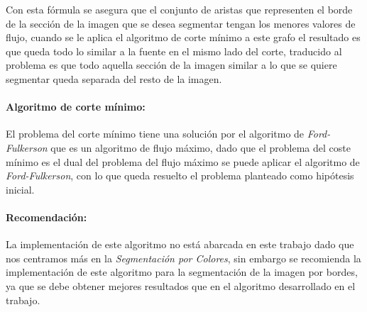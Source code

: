 \documentclass[a4paper,10pt,twocolumn]{article}
\begin{document}
Con esta f\'ormula se asegura que el conjunto de aristas que representen el borde de la secci\'on de la imagen que se desea segmentar 
tengan los menores valores de flujo, cuando se le aplica el algoritmo de corte m\'inimo a este grafo el resultado es que queda todo lo similar a la 
fuente en el mismo lado del corte, traducido al problema es que todo aquella secci\'on de la imagen similar a lo que se quiere segmentar queda
separada del resto de la imagen.\\

\paragraph*{Algoritmo de corte m\'inimo:}
El problema del corte m\'inimo tiene una soluci\'on por el algoritmo de \textit{Ford-Fulkerson} que es un algoritmo de flujo m\'aximo,
dado que el problema del coste m\'inimo es el dual del problema del flujo m\'aximo se puede aplicar el algoritmo de \textit{Ford-Fulkerson},
con lo que queda resuelto el problema planteado como hip\'otesis inicial.\\

\paragraph*{Recomendaci\'on:}
La implementaci\'on de este algoritmo no est\'a abarcada en este trabajo dado que nos centramos m\'as en la \textit{Segmentaci\'on por Colores},
sin embargo se recomienda la implementaci\'on de este algoritmo para la segmentaci\'on de la imagen por bordes, 
ya que se debe obtener mejores resultados que en el algoritmo desarrollado en el trabajo. 











 
 



\end{document}
